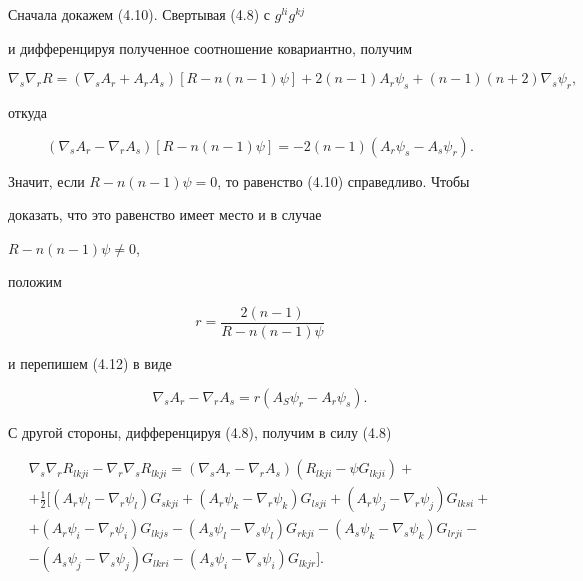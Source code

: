 Сначала докажем (4.10). Свертывая (4.8) с $g^{li}g^{kj}$


и дифференцируя полученное соотношение ковариантно, получим


$$


\nabla_s\nabla_r R=(\nabla_s A_r+A_r A_s)


[R-n(n-1)\psi]+2(n-1)A_r\psi_s+


(n-1)(n+2)\nabla_s\psi_r,


$$


откуда


\begin{equation}


(\nabla_s A_r-\nabla_r A_s)[R-n(n-1)\psi]=


-2(n-1)(A_r\psi_s-A_s\psi_r).\tag{4.12}


\end{equation}


Значит, если $R-n(n-1)\psi=0$, то равенство (4.10) справедливо. Чтобы


доказать, что это равенство имеет место и в случае


$R-n(n-1)\psi\ne 0$,


положим


$$


r=\frac{2(n-1)}{R-n(n-1)\psi}


$$


и перепишем (4.12) в виде


\begin{equation}


\nabla_s A_r-\nabla_r A_s=r(A_S\psi_r-A_r\psi_s).\tag{4.13}


\end{equation}





С другой стороны, дифференцируя (4.8), получим в силу (4.8)


\begin{multline}


\nabla_s\nabla_r R_{lkji}-\nabla_r\nabla_s R_{lkji}=


(\nabla_s A_r-\nabla_r A_s)(R_{lkji}-\psi G_{lkji})+ \\


+\tfrac{1}{2}[(A_r\psi_l-\nabla_r\psi_l)G_{skji}+


(A_r\psi_k-\nabla_r\psi_k)G_{lsji}+


(A_r\psi_j-\nabla_r\psi_j)G_{lksi}+ \\


+(A_r\psi_i-\nabla_r\psi_i)G_{lkjs}-


(A_s\psi_l-\nabla_s\psi_l)G_{rkji}-


(A_s\psi_k-\nabla_s\psi_k)G_{lrji} - \\


-(A_s\psi_j-\nabla_s\psi_j)G_{lkri}-


(A_s\psi_i-\nabla_s\psi_i)G_{lkjr}].\tag{4.14}


\end{multline}



